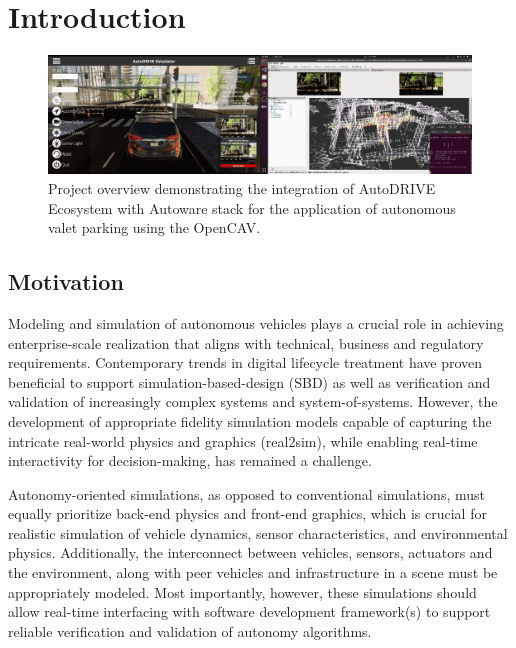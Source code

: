 \hypertarget{Introduction}{%
\section{Introduction}\label{Introduction}}

\begin{figure}[htpb]
    \centering
    \includegraphics[width=\linewidth]{Figures/fig1.png}
    \caption{Project overview demonstrating the integration of AutoDRIVE Ecosystem with Autoware stack for the application of autonomous valet parking using the OpenCAV.}
    \label{fig: figure1}
\end{figure}

\hypertarget{Motivation}{%
\subsection{Motivation}\label{Motivation}}

Modeling and simulation of autonomous vehicles plays a crucial role in achieving enterprise-scale realization that aligns with technical, business and regulatory requirements. Contemporary trends in digital lifecycle treatment have proven beneficial to support simulation-based-design (SBD) as well as verification and validation of increasingly complex systems and system-of-systems. However, the development of appropriate fidelity simulation models capable of capturing the intricate real-world physics and graphics (real2sim), while enabling real-time interactivity for decision-making, has remained a challenge.

Autonomy-oriented simulations, as opposed to conventional simulations, must equally prioritize back-end physics and front-end graphics, which is crucial for realistic simulation of vehicle dynamics, sensor characteristics, and environmental physics. Additionally, the interconnect between vehicles, sensors, actuators and the environment, along with peer vehicles and infrastructure in a scene must be appropriately modeled. Most importantly, however, these simulations should allow real-time interfacing with software development framework(s) to support reliable verification and validation of autonomy algorithms.

